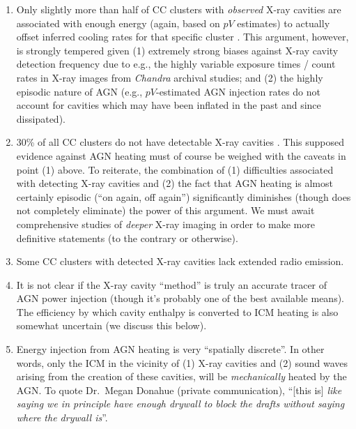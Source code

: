 

\begin{enumerate}

\item Only slightly more than half of CC clusters with {\it observed} X-ray cavities are associated with enough 
energy (again, based on $pV$ estimates) to actually offset inferred cooling rates for that specific cluster \citep{dunn06,mcnamara07}. This argument, 
however, is strongly tempered given (1) extremely strong biases against X-ray cavity detection frequency due to e.g., the highly variable exposure times / count rates in X-ray images from {\it Chandra} archival 
studies; and (2) the highly episodic nature of AGN (e.g., $pV$-estimated AGN injection rates do not account for cavities which may have been 
inflated in the past and since dissipated).   


\item 30\% of all CC clusters do not have detectable X-ray cavities \citep{dunn06}. This supposed evidence against AGN heating 
must of course be weighed with the caveats in point (1) above. To reiterate, the combination of (1) difficulties associated 
with detecting X-ray cavities and (2) the fact that AGN heating is almost certainly episodic (``on again, off again'') significantly 
diminishes (though does not completely eliminate) the power of this argument. We must await comprehensive studies of {\it deeper} X-ray 
imaging in order to make more definitive statements (to the contrary or otherwise). 


\item Some CC clusters with detected X-ray cavities lack extended radio emission. 



\item It is not clear if the X-ray cavity ``method'' is truly an accurate tracer of AGN power injection (though it's probably one 
of the best available means). The efficiency by which cavity enthalpy is converted to ICM heating is also 
somewhat uncertain (we discuss this below).   


\item Energy injection from AGN heating is very ``spatially discrete''. In other words, only the ICM in the vicinity of (1) X-ray 
cavities and (2) sound waves arising from the creation of these cavities, will be {\it mechanically} heated by the AGN. To quote 
Dr.~Megan Donahue (private communication), ``[this is] {\it like saying we in principle have enough drywall
to block the drafts without saying where the drywall is}''.  



\end{enumerate}
